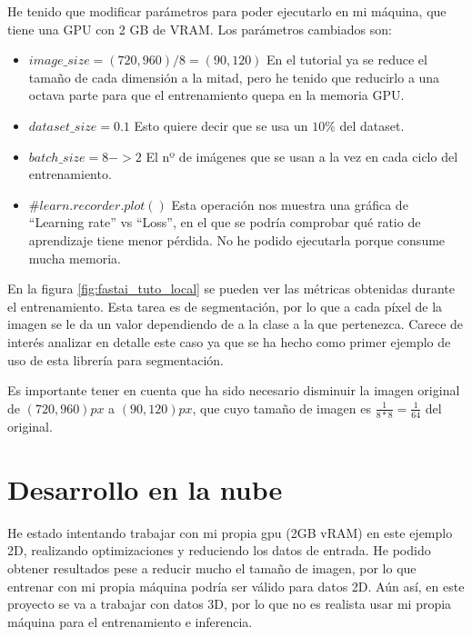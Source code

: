 He tenido que modificar parámetros para poder ejecutarlo en mi máquina, que tiene una GPU con 2 GB de VRAM. Los parámetros cambiados son:
\begin{itemize}
\item $image\_size = (720, 960) / 8 = (90, 120)$ En el tutorial ya se reduce el tamaño de cada dimensión a la mitad, pero he tenido que reducirlo a una octava parte para que el entrenamiento quepa en la memoria GPU.
\item $dataset\_size = 0.1$ Esto quiere decir que se usa un $10\%$ del dataset.
\item $batch\_size = 8 -> 2$ El nº de imágenes que se usan a la vez en cada ciclo del entrenamiento.
\item $\#learn.recorder.plot()$ Esta operación nos muestra una gráfica de “Learning rate” vs “Loss”, en el que se podría comprobar qué ratio de aprendizaje tiene menor pérdida. No he podido ejecutarla porque consume mucha memoria.
\end{itemize}


En la figura \ref{fig:fastai_tuto_local} se pueden ver las métricas obtenidas durante el entrenamiento. Esta tarea es de segmentación, por lo que a cada píxel de la imagen se le da un valor dependiendo de a la clase a la que pertenezca. Carece de interés analizar en detalle este caso ya que se ha hecho como primer ejemplo de uso de esta librería para segmentación.

Es importante tener en cuenta que ha sido necesario disminuir la imagen original de $(720, 960)px$ a $(90, 120)px$, que cuyo tamaño de imagen es $\frac{1}{8*8}=\frac{1}{64}$ del original.

\section{Desarrollo en la nube}\label{sec:cloud_dev}

He estado intentando trabajar con mi propia gpu (2GB vRAM) en este ejemplo 2D, realizando optimizaciones y reduciendo los datos de entrada. He podido obtener resultados pese a reducir mucho el tamaño de imagen, por lo que entrenar con mi propia máquina podría ser válido para datos 2D. Aún así, en este proyecto se va a trabajar con datos 3D, por lo que no es realista usar mi propia máquina para el entrenamiento e inferencia.


